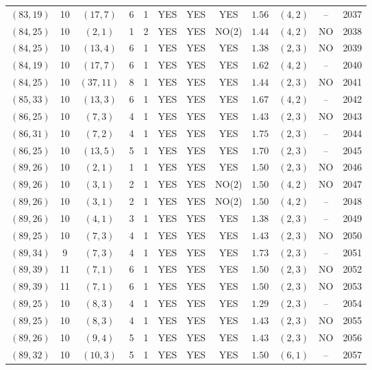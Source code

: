 \begin{longtable}{|c|c|c|c|c|c|c|c|c|c|c|c|}
$(83,19)$ & 10 & $(17,7)$ & 6 & 1 & YES & YES & YES & $1.56$ & $(4,2)$ & -- & 2037\\
$(84,25)$ & 10 & $(2,1)$ & 1 & 2 & YES & YES & NO(2) & $1.44$ & $(4,2)$ & NO & 2038\\
$(84,25)$ & 10 & $(13,4)$ & 6 & 1 & YES & YES & YES & $1.38$ & $(2,3)$ & NO & 2039\\
$(84,19)$ & 10 & $(17,7)$ & 6 & 1 & YES & YES & YES & $1.62$ & $(4,2)$ & -- & 2040\\
$(84,25)$ & 10 & $(37,11)$ & 8 & 1 & YES & YES & YES & $1.44$ & $(2,3)$ & NO & 2041\\
$(85,33)$ & 10 & $(13,3)$ & 6 & 1 & YES & YES & YES & $1.67$ & $(4,2)$ & -- & 2042\\
$(86,25)$ & 10 & $(7,3)$ & 4 & 1 & YES & YES & YES & $1.43$ & $(2,3)$ & NO & 2043\\
$(86,31)$ & 10 & $(7,2)$ & 4 & 1 & YES & YES & YES & $1.75$ & $(2,3)$ & -- & 2044\\
$(86,25)$ & 10 & $(13,5)$ & 5 & 1 & YES & YES & YES & $1.70$ & $(2,3)$ & -- & 2045\\
$(89,26)$ & 10 & $(2,1)$ & 1 & 1 & YES & YES & YES & $1.50$ & $(2,3)$ & NO & 2046\\
$(89,26)$ & 10 & $(3,1)$ & 2 & 1 & YES & YES & NO(2) & $1.50$ & $(4,2)$ & NO & 2047\\
$(89,26)$ & 10 & $(3,1)$ & 2 & 1 & YES & YES & NO(2) & $1.50$ & $(4,2)$ & -- & 2048\\
$(89,26)$ & 10 & $(4,1)$ & 3 & 1 & YES & YES & YES & $1.38$ & $(2,3)$ & -- & 2049\\
$(89,25)$ & 10 & $(7,3)$ & 4 & 1 & YES & YES & YES & $1.43$ & $(2,3)$ & NO & 2050\\
$(89,34)$ & 9 & $(7,3)$ & 4 & 1 & YES & YES & YES & $1.73$ & $(2,3)$ & -- & 2051\\
$(89,39)$ & 11 & $(7,1)$ & 6 & 1 & YES & YES & YES & $1.50$ & $(2,3)$ & NO & 2052\\
$(89,39)$ & 11 & $(7,1)$ & 6 & 1 & YES & YES & YES & $1.50$ & $(2,3)$ & NO & 2053\\
$(89,25)$ & 10 & $(8,3)$ & 4 & 1 & YES & YES & YES & $1.29$ & $(2,3)$ & -- & 2054\\
$(89,25)$ & 10 & $(8,3)$ & 4 & 1 & YES & YES & YES & $1.43$ & $(2,3)$ & NO & 2055\\
$(89,26)$ & 10 & $(9,4)$ & 5 & 1 & YES & YES & YES & $1.43$ & $(2,3)$ & NO & 2056\\
$(89,32)$ & 10 & $(10,3)$ & 5 & 1 & YES & YES & YES & $1.50$ & $(6,1)$ & -- & 2057\\

\end{longtable}
